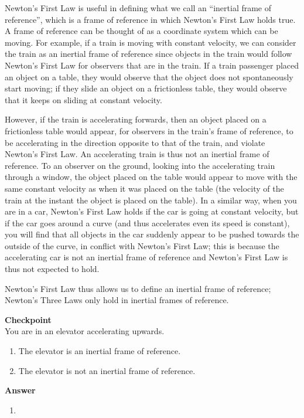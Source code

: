Newton's First Law is useful in defining what we call an ``inertial frame of reference'', which is a frame of reference in which Newton's First Law holds true. A frame of reference can be thought of as a coordinate system which can be moving. For example, if a train is moving with constant velocity, we can consider the train as an inertial frame of reference since objects in the train would follow Newton's First Law for observers that are in the train. If a train passenger placed an object on a table, they would observe that the object does not spontaneously start moving; if they slide an object on a frictionless table, they would observe that it keeps on sliding at constant velocity.

However, if the train is accelerating forwards, then an object placed on a frictionless table would appear, for observers in the train's frame of reference, to be accelerating in the direction opposite to that of the train, and violate Newton's First Law. An accelerating train is thus not an inertial frame of reference. To an observer on the ground, looking into the accelerating train through a window, the object placed on the table would appear to move with the same constant velocity as when it was placed on the table (the velocity of the train at the instant the object is placed on the table). In a similar way, when you are in a car, Newton's First Law holds if the car is going at constant velocity, but if the car goes around a curve (and thus accelerates even its speed is constant), you will find that all objects in the car suddenly appear to be pushed towards the outside of the curve, in conflict with Newton's First Law; this is because the accelerating car is not an inertial frame of reference and Newton's First Law is thus not expected to hold.

Newton's First Law thus allows us to define an inertial frame of reference; Newton's Three Laws only hold in inertial frames of reference.

\begin{framed}
\textbf{Checkpoint}\\
You are in an elevator accelerating upwards.

\begin{enumerate}
\item The elevator is an inertial frame of reference.
\item The elevator is not an inertial frame of reference.
\end{enumerate}

\begin{framed}
\textbf{Answer}\\
\begin{enumerate}[resume]
\item
\end{enumerate}
\end{framed}
\end{framed}

